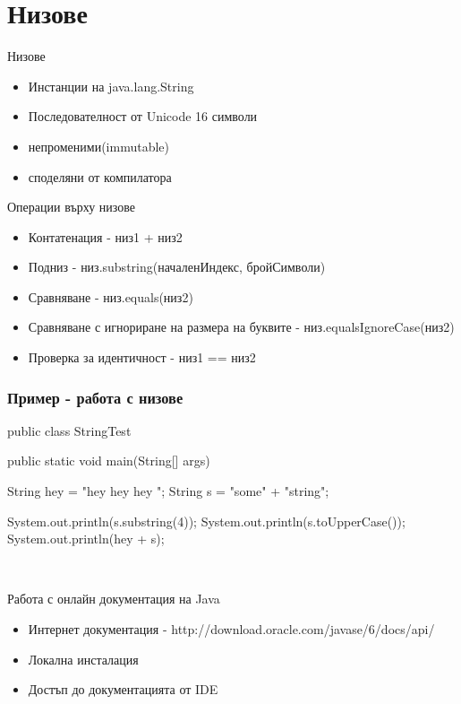\documentclass{beamer}
\begin{document}
\section{Низове}
\begin{frame}{Низове}
  \transdissolve
  \begin{itemize}
  \item Инстанции на java.lang.String
  \item Последователност от Unicode 16 символи
  \item непроменими(immutable)
  \item споделяни от компилатора
  \end{itemize}
\end{frame}

\begin{frame}{Операции върху низове}
  \transdissolve
  \begin{itemize}
  \item Контатенация - низ1 + низ2
  \item Подниз - низ.substring(началенИндекс, бройСимволи)
  \item Сравняване - низ.equals(низ2)
  \item Сравняване с игнориране на размера на буквите -
    низ.equalsIgnoreCase(низ2)
  \item Проверка за идентичност - низ1 == низ2
  \end{itemize}
\end{frame}

\begin{frame}[fragile]
  \frametitle{Пример - работа с низове}
public class StringTest {
  public static void main(String[] args) {
    String hey = "hey hey hey ";
    String s = "some" + "string";

    System.out.println(s.substring(4));
    System.out.println(s.toUpperCase());
    System.out.println(hey + s);
  }
}
  \transdissolve
\begin{lstlisting}
  
\end{lstlisting}
\end{frame}

\begin{frame}{Работа с онлайн документация на Java}
  \transdissolve
  \begin{itemize}
  \item Интернет документация -
    http://download.oracle.com/javase/6/docs/api/
  \item Локална инсталация
  \item Достъп до документацията от IDE
  \end{itemize}
\end{frame}
\end{document}
